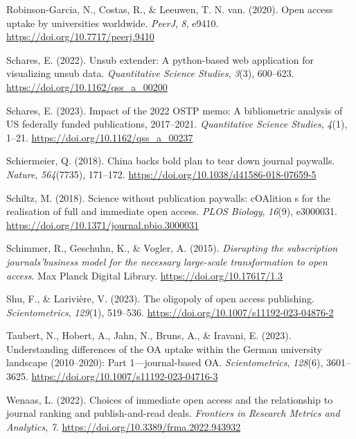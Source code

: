 \documentclass[a4paper,man,floatsintext,longtable,noextraspace,12pt]{apa6}
\newenvironment{CSLReferences}%
  {}%
  {\par}
\begin{document}
\begin{CSLReferences}{1}{0}
\leavevmode{}%
Robinson-Garcia, N., Costas, R., \& Leeuwen, T. N. van. (2020). Open
access uptake by universities worldwide. \emph{{PeerJ}}, \emph{8},
e9410. \url{https://doi.org/10.7717/peerj.9410}

\leavevmode{}%
Schares, E. (2022). Unsub extender: A python-based web application for
visualizing unsub data. \emph{Quantitative Science Studies},
\emph{3}(3), 600--623. \url{https://doi.org/10.1162/qss_a_00200}

\leavevmode{}%
Schares, E. (2023). Impact of the 2022 OSTP memo: A bibliometric
analysis of US federally funded publications, 2017--2021.
\emph{Quantitative Science Studies}, \emph{4}(1), 1--21.
\url{https://doi.org/10.1162/qss_a_00237}

\leavevmode{}%
Schiermeier, Q. (2018). China backs bold plan to tear down journal
paywalls. \emph{Nature}, \emph{564}(7735), 171--172.
\url{https://doi.org/10.1038/d41586-018-07659-5}

\leavevmode{}%
Schiltz, M. (2018). Science without publication paywalls: cOAlition s
for the realisation of full and immediate open access. \emph{PLOS
Biology}, \emph{16}(9), e3000031.
\url{https://doi.org/10.1371/journal.pbio.3000031}

\leavevmode{}%
Schimmer, R., Geschuhn, K., \& Vogler, A. (2015). \emph{{Disrupting the
subscription journals'business model for the necessary large-scale
transformation to open access}}. Max Planck Digital Library.
\url{https://doi.org/10.17617/1.3}

\leavevmode{}%
Shu, F., \& Larivière, V. (2023). The oligopoly of open access
publishing. \emph{Scientometrics}, \emph{129}(1), 519--536.
\url{https://doi.org/10.1007/s11192-023-04876-2}

\leavevmode{}%
Taubert, N., Hobert, A., Jahn, N., Bruns, A., \& Iravani, E. (2023).
Understanding differences of the OA uptake within the {German}
university landscape (2010--2020): Part 1---journal-based OA.
\emph{Scientometrics}, \emph{128}(6), 3601--3625.
\url{https://doi.org/10.1007/s11192-023-04716-3}

\leavevmode{}%
Wenaas, L. (2022). Choices of immediate open access and the relationship
to journal ranking and publish-and-read deals. \emph{Frontiers in
Research Metrics and Analytics}, \emph{7}.
\url{https://doi.org/10.3389/frma.2022.943932}


\end{CSLReferences}
\end{document}
